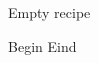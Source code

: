\begin{recipe}
[ %
    preparationtime = {\unit[45]{min}},
]
{Empty recipe}

    \ingredients
    {%
    }

    \preparation
    {%
	    \step Begin
	    \step Eind
    }
    
\end{recipe}
